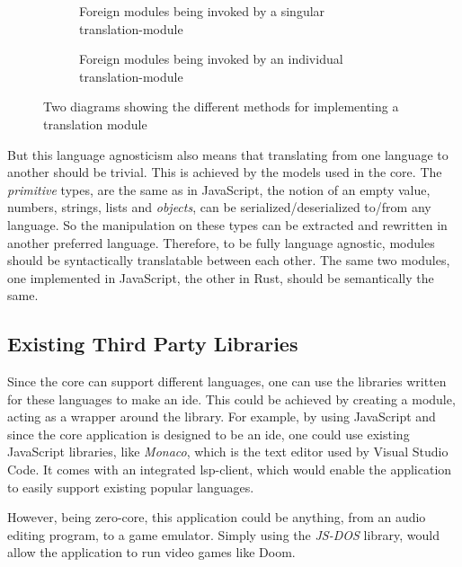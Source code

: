 \begin{figure}[H]
  \begin{subfigure}[h]{0.49\linewidth}
    
    \caption{Foreign modules being invoked by a singular translation-module}
    \label{fig:fm1}
  \end{subfigure}
  \hfill
  \begin{subfigure}[h]{0.49\linewidth}
    
    \caption{Foreign modules being invoked by an individual translation-module}
    \label{fig:fm2}
  \end{subfigure}
  \caption{
    Two diagrams showing the different methods for implementing a translation
    module
  }
  \label{fig:fm}
\end{figure}

But this language agnosticism also means that translating from one language to
another should be trivial. This is achieved by the models used in the core. The
\textit{primitive} types, are the same as in JavaScript, the notion of an empty
value, numbers, strings, lists and \textit{objects}, can be
serialized/deserialized to/from any language. So the manipulation on these types
can be extracted and rewritten in another preferred language. Therefore, to be
fully language agnostic, modules should be syntactically translatable between
each other. The same two modules, one implemented in JavaScript, the other in
Rust, should be semantically the same.

\subsection{Existing Third Party Libraries}

Since the core can support different languages, one can use the libraries
written for these languages to make an \gls*{ide}. This could be achieved by
creating a module, acting as a wrapper around the library. For example, by
using JavaScript and since the core application is designed to be an \gls*{ide},
one could use existing JavaScript libraries, like \textit{Monaco}, which is the
text editor used by Visual Studio Code. It comes with an integrated
\gls*{lsp}-client, which would enable the application to easily support existing
popular languages.

However, being zero-core, this application could be anything, from an audio
editing program, to a game emulator. Simply using the \textit{JS-DOS} library,
would allow the application to run video games like Doom.

